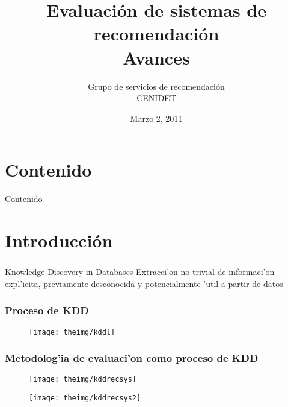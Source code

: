 \documentclass{beamer}
\title[]{Evaluaci\'{o}n de sistemas de recomendaci\'{o}n\\Avances}
\author[]{Grupo de servicios de recomendaci\'{o}n\\CENIDET}
\institute[Cenidet]{}
\date{Marzo 2, 2011}
\begin{document}
\begin{frame}
  \titlepage
\end{frame}

\section*{Contenido}
\begin{frame}{Contenido}
  \tableofcontents%
\end{frame}

\section{Introducci\'{o}n}
\begin{frame}[label=antecedentes]
\frametitle{}
    \begin{block}{Knowledge Discovery in Databases}
    Extracci'on no trivial de informaci'on expl'icita, previamente  desconocida y potencialmente 'util a partir de datos~\cite{hahsler:GeyerSchulz2002d}
    \end{block}
\end{frame} 
\begin{frame}[label=motiva]
\frametitle{Proceso de KDD}
\begin{figure}[h]
    \centering
    \texttt{[image: theimg/kddl]}
\end{figure}
\end{frame} 
\begin{frame}[label=recsyskdd]
\frametitle{Metodolog'ia de evaluaci'on como proceso de KDD}
    \begin{figure}[h]
    \centering
    \texttt{[image: theimg/kddrecsys]}
    \end{figure}
    \vspace{-1.5cm}
    \begin{figure}[h]
    \flushleft
    \texttt{[image: theimg/kddrecsys2]}
    \end{figure}
\end{frame} 
\end{document}
